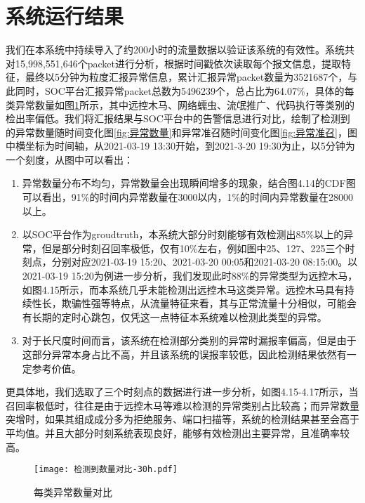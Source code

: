 \section{系统运行结果}
我们在本系统中持续导入了约200小时的流量数据以验证该系统的有效性。系统共对15,998,551,646个packet进行分析，根据时间戳依次读取每个报文信息，提取特征，最终以5分钟为粒度汇报异常信息，累计汇报异常packet数量为3521687个，与此同时，SOC平台汇报异常packet总数为5496239个，总占比为64.07\%，具体的每类异常数量如图\ref{fig:每类异常数量对比}所示，其中远控木马、网络蠕虫、流氓推广、代码执行等类别的检出率偏低。我们将汇报结果与SOC平台中的告警信息进行对比，绘制了检测到的异常数量随时间变化图\ref{fig:异常数量}和异常准召随时间变化图\ref{fig:异常准召}，图中横坐标为时间轴，从2021-03-19 13:30开始，到2021-3-20 19:30为止，以5分钟为一个刻度，从图中可以看出：
\begin{enumerate}
  \item 异常数量分布不均匀，异常数量会出现瞬间增多的现象，结合图4.14的CDF图可以看出，91\%的时间内异常数量在3000以内，1\%的时间内异常数量在28000以上。
  \item 以SOC平台作为groudtruth，本系统大部分时刻能够有效检测出85\%以上的异常，但是部分时刻召回率极低，仅有10\%左右，例如图中25、127、225三个时刻点，分别对应2021-03-19 15:20、2021-03-20 00:05和2021-03-20 08:15:00。以2021-03-19 15:20为例进一步分析，我们发现此时88\%的异常类型为远控木马，如图4.15所示，而本系统几乎未能检测出远控木马这类异常。远控木马具有持续性长，欺骗性强等特点，从流量特征来看，其与正常流量十分相似，可能会有长期的定时心跳包，仅凭这一点特征本系统难以检测此类型的异常。
  \item 对于长尺度时间而言，该系统在检测部分类别的异常时漏报率偏高，但是由于这部分异常本身占比不高，并且该系统的误报率较低，因此检测结果依然有一定参考价值。
\end{enumerate}

更具体地，我们选取了三个时刻点的数据进行进一步分析，如图4.15-4.17所示，当召回率极低时，往往是由于远控木马等难以检测的异常类别占比较高；而异常数量突增时，如果其组成成分多为拒绝服务、端口扫描等，系统的检测结果甚至会高于平均值。并且大部分时刻系统表现良好，能够有效检测出主要异常，且准确率较高。


\begin{figure}
  \centering
  \texttt{[image: 检测到数量对比-30h.pdf]}
  \caption{每类异常数量对比}
  \label{fig:每类异常数量对比}
\end{figure}


